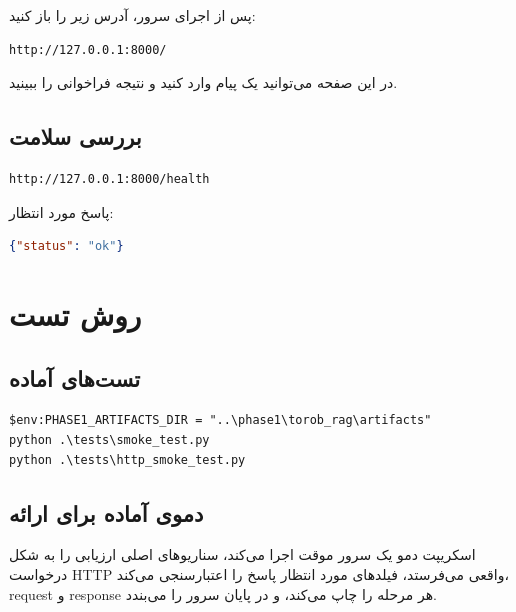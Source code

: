 \documentclass[12pt,a4paper]{article}
\newcommand{\code}[1]{\lr{\texttt{#1}}}
\begin{document}
پس از اجرای سرور، آدرس زیر را باز کنید:

\begin{latin}
\begin{lstlisting}
http://127.0.0.1:8000/
\end{lstlisting}
\end{latin}

در این صفحه می‌توانید یک پیام وارد کنید و نتیجه فراخوانی \code{/chat} را ببینید.

\subsection{بررسی سلامت}

\begin{latin}
\begin{lstlisting}
http://127.0.0.1:8000/health
\end{lstlisting}
\end{latin}

پاسخ مورد انتظار:

\begin{latin}
\begin{lstlisting}[language=json]
{"status": "ok"}
\end{lstlisting}
\end{latin}

\section{روش تست}

\subsection{تست‌های آماده}

\begin{latin}
\begin{lstlisting}
$env:PHASE1_ARTIFACTS_DIR = "..\phase1\torob_rag\artifacts"
python .\tests\smoke_test.py
python .\tests\http_smoke_test.py
\end{lstlisting}
\end{latin}

\subsection{دموی آماده برای ارائه}

اسکریپت دمو یک سرور موقت \code{/chat} اجرا می‌کند، سناریوهای اصلی ارزیابی را به شکل درخواست HTTP واقعی می‌فرستد، فیلدهای مورد انتظار پاسخ را اعتبارسنجی می‌کند، request و response هر مرحله را چاپ می‌کند، و در پایان سرور را می‌بندد.
\end{document}
